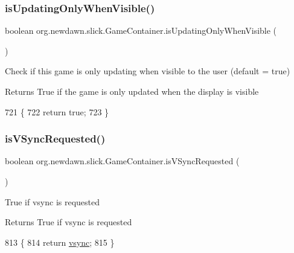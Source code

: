 \subsubsection{\texorpdfstring{is\+Updating\+Only\+When\+Visible()}{isUpdatingOnlyWhenVisible()}}
{\footnotesize\ttfamily boolean org.\+newdawn.\+slick.\+Game\+Container.\+is\+Updating\+Only\+When\+Visible (\begin{DoxyParamCaption}{ }\end{DoxyParamCaption})\hspace{0.3cm}{\ttfamily [inline]}}

Check if this game is only updating when visible to the user (default = true)

\begin{DoxyReturn}{Returns}
True if the game is only updated when the display is visible 
\end{DoxyReturn}

\begin{DoxyCode}
721                                                \{
722         \textcolor{keywordflow}{return} \textcolor{keyword}{true};
723     \}
\end{DoxyCode}
\mbox{\label{classorg_1_1newdawn_1_1slick_1_1_game_container_ae73b093fcf68859fd130dde791398615}} 
\subsubsection{\texorpdfstring{is\+V\+Sync\+Requested()}{isVSyncRequested()}}
{\footnotesize\ttfamily boolean org.\+newdawn.\+slick.\+Game\+Container.\+is\+V\+Sync\+Requested (\begin{DoxyParamCaption}{ }\end{DoxyParamCaption})\hspace{0.3cm}{\ttfamily [inline]}}

True if vsync is requested

\begin{DoxyReturn}{Returns}
True if vsync is requested 
\end{DoxyReturn}

\begin{DoxyCode}
813                                       \{
814         \textcolor{keywordflow}{return} \mbox{\hyperlink{classorg_1_1newdawn_1_1slick_1_1_game_container_a1a1161c9e75a47325ad0256583fee409}{vsync}};
815     \}
\end{DoxyCode}
\mbox{\label{classorg_1_1newdawn_1_1slick_1_1_game_container_ac9ba130c92ce7741d0d769cf0d30677d}} 
